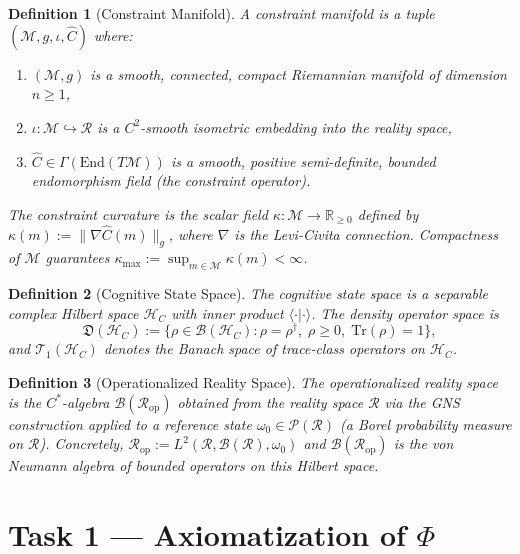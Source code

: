\documentclass[11pt,a4paper]{article}
\newtheorem{definition}{Definition}[section]
\theoremstyle{remark}
\newcommand{\CR}{\mathcal{R}}
\newcommand{\CM}{\mathcal{M}}
\newcommand{\HC}{\mathcal{H}_C}
\newcommand{\CB}{\mathcal{B}}
\newcommand{\hatC}{\hat{C}}
\newcommand{\Tr}{\mathrm{Tr}}
\begin{document}
\begin{definition}[Constraint Manifold]
\label{def:constraint_manifold}
A \emph{constraint manifold} is a tuple $(\CM, g, \iota, \hatC)$ where:
\begin{enumerate}[label=(\roman*)]
  \item $(\CM, g)$ is a smooth, connected, compact Riemannian manifold
    of dimension $n \geq 1$,
  \item $\iota: \CM \hookrightarrow \CR$ is a $C^2$-smooth isometric
    embedding into the reality space,
  \item $\hatC \in \Gamma(\mathrm{End}(T\CM))$ is a smooth, positive
    semi-definite, bounded endomorphism field (the \emph{constraint
    operator}).
\end{enumerate}
The \emph{constraint curvature} is the scalar field
$\kappa: \CM \to \mathbb{R}_{\geq 0}$ defined by
$\kappa(m) := \|\nabla\hatC(m)\|_g$, where $\nabla$ is the Levi-Civita
connection.  Compactness of $\CM$ guarantees
$\kappa_{\max} := \sup_{m \in \CM} \kappa(m) < \infty$.
\end{definition}

\begin{definition}[Cognitive State Space]
\label{def:cognitive}
The \emph{cognitive state space} is a separable complex Hilbert space
$\HC$ with inner product $\langle \cdot | \cdot \rangle$.  The
\emph{density operator space} is
\[
  \mathfrak{D}(\HC) := \bigl\{
    \rho \in \CB(\HC) :
    \rho = \rho^\dagger,\;
    \rho \geq 0,\;
    \Tr(\rho) = 1
  \bigr\},
\]
and $\mathcal{T}_1(\HC)$ denotes the Banach space of trace-class
operators on $\HC$.
\end{definition}

\begin{definition}[Operationalized Reality Space]
\label{def:rop}
The \emph{operationalized reality space} is the $C^*$-algebra
$\CB(\CR_{\mathrm{op}})$ obtained from the reality space $\CR$ via the
GNS construction applied to a reference state
$\omega_0 \in \mathcal{P}(\CR)$ (a Borel probability measure on $\CR$).
Concretely, $\CR_{\mathrm{op}} := L^2(\CR, \mathcal{B}(\CR), \omega_0)$
and $\CB(\CR_{\mathrm{op}})$ is the von Neumann algebra of bounded
operators on this Hilbert space.
\end{definition}

\section{Task 1 --- Axiomatization of $\Phi$}
\label{sec:phi}
\end{document}

